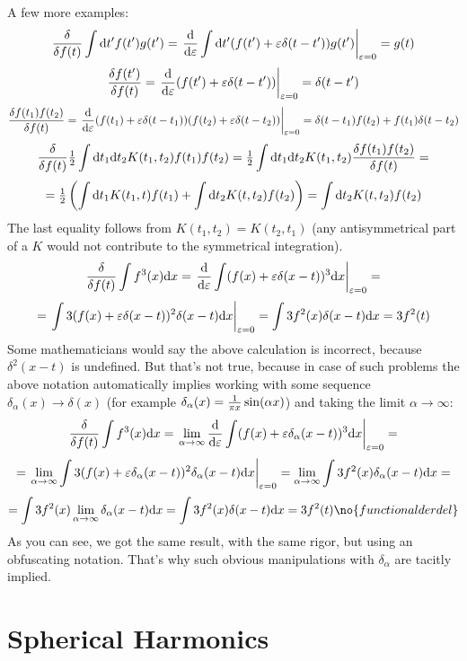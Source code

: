 A few more examples:
$${\delta\over\delta f(t)}\int{\rm d} t'f(t')g(t')=
\left.{{\rm d}\over{\rm d}\varepsilon}\int{\rm d} t'(f(t')+\varepsilon\delta(t-t'))g(t')
\right|_{\varepsilon=0}=g(t)$$
$${\delta f(t')\over\delta f(t)}=
\left.{{\rm d}\over{\rm d}\varepsilon}(f(t')+\varepsilon\delta(t-t'))
\right|_{\varepsilon=0}=\delta(t-t')$$
$${\delta f(t_1)f(t_2)\over\delta f(t)}=
\left.{{\rm d}\over{\rm d}\varepsilon}(f(t_1)+\varepsilon\delta(t-t_1))
(f(t_2)+\varepsilon\delta(t-t_2))
\right|_{\varepsilon=0}=\delta(t-t_1)f(t_2)+f(t_1)\delta(t-t_2)$$
$${\delta\over\delta f(t)}{\textstyle{1\over2}}\int{\rm d} t_1{\rm d} t_2K(t_1,t_2)f(t_1)f(t_2)=
{\textstyle{1\over2}}\int{\rm d} t_1{\rm d} t_2K(t_1,t_2){\delta f(t_1)f(t_2)\over\delta f(t)}=$$
$$={\textstyle{1\over2}}\left(\int{\rm d} t_1 K(t_1,t)f(t_1)+\int{\rm d} t_2 K(t,t_2)f(t_2)\right)
=\int{\rm d} t_2 K(t,t_2)f(t_2)$$
The last equality follows from $K(t_1,t_2)=K(t_2,t_1)$ (any antisymmetrical
part of a $K$ would not contribute to the symmetrical integration).
$${\delta\over\delta f(t)}\int f^3(x){\rm d} x=
\left.{{\rm d}\over{\rm d}\varepsilon}\int(f(x)+\varepsilon\delta(x-t))^3{\rm d} x
\right|_{\varepsilon=0}=$$
$$=\left.\int3(f(x)+\varepsilon\delta(x-t))^2\delta(x-t){\rm d} x
\right|_{\varepsilon=0}=\int3f^2(x)\delta(x-t){\rm d} x=3f^2(t)$$
Some mathematicians would say the above calculation is incorrect, because
$\delta^2(x-t)$ is undefined. But that's not true, because in case of such
problems the above notation
automatically implies working with some sequence $\delta_\alpha(x) \to \delta(x)$
(for example $\delta_\alpha(x) = {1\over\pi x}\sin(\alpha x)$)
and taking the limit $\alpha\to\infty$:
$${\delta\over\delta f(t)}\int f^3(x){\rm d} x=
\left.\lim_{\alpha\to\infty}{{\rm d}\over{\rm d}\varepsilon}\int(f(x)+\varepsilon\delta_\alpha(x-t))^3{\rm d} x
\right|_{\varepsilon=0}=$$
$$=\left.\lim_{\alpha\to\infty}\int3(f(x)+\varepsilon\delta_\alpha(x-t))^2\delta_\alpha(x-t){\rm d} x
\right|_{\varepsilon=0}=\lim_{\alpha\to\infty}\int3f^2(x)\delta_\alpha(x-t){\rm d} x=$$
$$=\int3f^2(x)\lim_{\alpha\to\infty}\delta_\alpha(x-t)\d x=
\int3f^2(x)\delta(x-t)\d x=3f^2(t)\no{functionalderdel}$$
As you can see, we got the same result, with the same rigor, but using an
obfuscating notation. That's why such obvious manipulations with $\delta_\alpha$
are tacitly implied.

\section{Spherical Harmonics}

